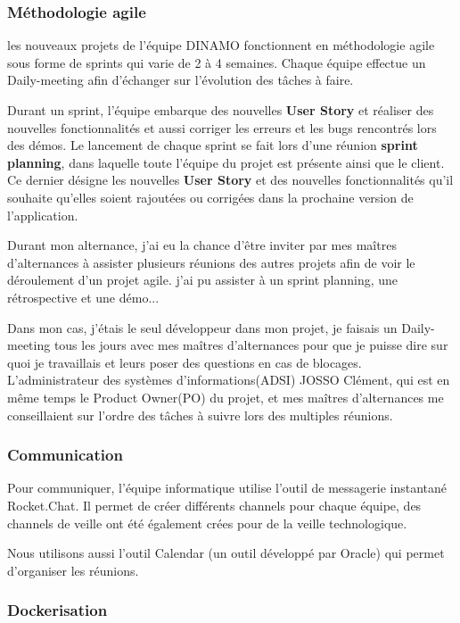 \documentclass[12pt]{article}
\begin{document}
\subsubsection{Méthodologie agile}

les nouveaux projets de l'équipe DINAMO fonctionnent en méthodologie agile sous forme de sprints qui varie de 2 à 4 semaines. Chaque équipe effectue un Daily-meeting afin d'échanger sur l'évolution des tâches à faire.

Durant un sprint, l'équipe embarque des nouvelles \textbf{User Story} et réaliser des nouvelles fonctionnalités et aussi corriger les erreurs et les bugs rencontrés lors des démos. Le lancement de chaque sprint se fait lors d'une réunion \textbf{sprint planning}, dans laquelle toute l'équipe du projet est présente ainsi que le client. Ce dernier désigne les nouvelles \textbf{User Story} et des nouvelles fonctionnalités qu'il souhaite qu'elles soient rajoutées ou corrigées dans la prochaine version de l'application. 

Durant mon alternance, j'ai eu la chance d'être inviter par mes maîtres d'alternances à assister plusieurs réunions des autres projets afin de voir le déroulement d'un projet agile. j'ai pu assister à un sprint planning, une rétrospective et une démo...    

Dans mon cas, j'étais le seul développeur dans mon projet, je faisais un Daily-meeting  tous les jours avec mes maîtres d'alternances pour que je puisse dire sur quoi je travaillais et leurs poser des questions en cas de blocages. L'administrateur des systèmes d'informations(ADSI) JOSSO Clément, qui est en même temps le Product Owner(PO) du projet, et mes maîtres d'alternances me conseillaient sur l'ordre des tâches à suivre lors des multiples réunions.   

\subsubsection{Communication}

Pour communiquer, l'équipe informatique utilise l'outil de messagerie instantané Rocket.Chat. Il permet de créer différents
channels pour chaque équipe, des channels de veille ont été également crées pour de la veille technologique.

Nous utilisons aussi l'outil Calendar (un outil développé par Oracle) qui permet d’organiser les réunions.  

\subsubsection{Dockerisation}
\end{document}
